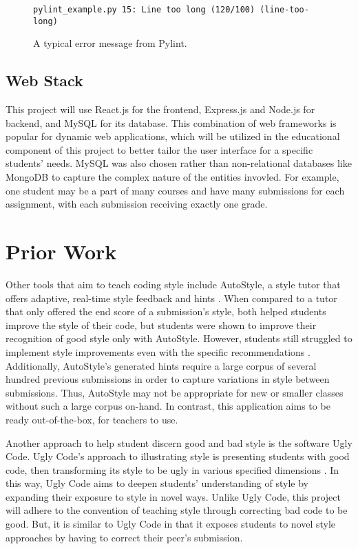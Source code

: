 \documentclass[10pt,twocolumn]{article}
\begin{document}
\begin{figure}
\begin{lstlisting}
pylint_example.py 15: Line too long (120/100) (line-too-long)
\end{lstlisting}
	\centering
	\caption{A typical error message from Pylint.}
\end{figure}

\subsection{Web Stack}
This project will use React.js for the frontend, Express.js and Node.js for backend, and MySQL for its database. 
This combination of web frameworks is popular for dynamic web applications, which will be utilized in the educational component of this project to better tailor the user interface for a specific students' needs. 
MySQL was also chosen rather than non-relational databases like MongoDB to capture the complex nature of the entities invovled. 
For example, one student may be a part of many courses and have many submissions for each assignment, with each submission receiving exactly one grade.


\section{Prior Work}
Other tools that aim to teach coding style include AutoStyle, a style tutor that offers adaptive, real-time style feedback and hints \cite{moghadam_2015}. 
When compared to a tutor that only offered the end score of a submission’s style, both helped students improve the style of their code, but students were shown to improve their recognition of good style only with AutoStyle. 
However, students still struggled to implement style improvements even with the specific recommendations \cite{wiese_2017}. 
Additionally, AutoStyle’s generated hints require a large corpus of several hundred previous submissions in order to capture variations in style between submissions. 
Thus, AutoStyle may not be appropriate for new or smaller classes without such a large corpus on-hand. 
In contrast, this application aims to be ready out-of-the-box, for teachers to use.

Another approach to help student discern good and bad style is the software Ugly Code.
Ugly Code's approach to illustrating style is presenting students with good code, then transforming its style to be ugly in various specified dimensions \cite{mcmaster_2013}. 
In this way, Ugly Code aims to deepen students' understanding of style by expanding their exposure to style in novel ways. 
Unlike Ugly Code, this project will adhere to the convention of teaching style through correcting bad code to be good. 
But, it is similar to Ugly Code in that it exposes students to novel style approaches by having to correct their peer's submission. 
\end{document}
